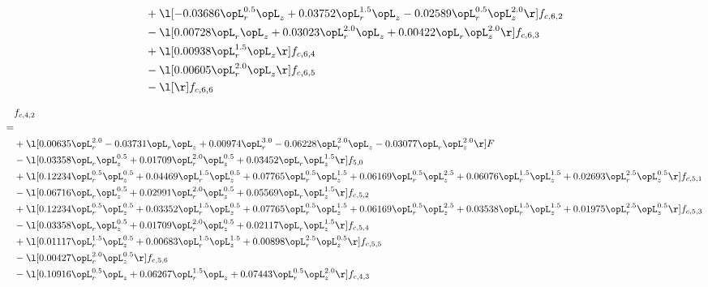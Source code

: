 \begin{alignat}{2}
& + \l[  -0.03686 \opL_r^{0.5} \opL_z +  0.03752 \opL_r^{1.5} \opL_z   -0.02589 \opL_r^{0.5} \opL_z^{2.0}  \r] f_{c,6,2} \nonumber \\ 
& - \l[  0.00728 \opL_r \opL_z +  0.03023 \opL_r^{2.0} \opL_z +  0.00422 \opL_r \opL_z^{2.0}  \r] f_{c,6,3} \nonumber \\ 
& + \l[  0.00938 \opL_r^{1.5} \opL_z  \r] f_{c,6,4} \nonumber \\ 
& - \l[  0.00605 \opL_r^{2.0} \opL_z  \r] f_{c,6,5} \nonumber \\ 
& - \l[  \r] f_{c,6,6} \nonumber \\ 
\end{alignat} 


\begin{alignat}{2} 
\label{eq:f_42_2} 
& f_{c,4,2} \nonumber \\ 
 = \\ 
& + \l[  0.00635 \opL_r^{2.0}   -0.03731 \opL_r \opL_z +  0.00974 \opL_r^{3.0}   -0.06228 \opL_r^{2.0} \opL_z   -0.03077 \opL_r \opL_z^{2.0}  \r] F \nonumber \\ 
& - \l[  0.03358 \opL_r \opL_z^{0.5} +  0.01709 \opL_r^{2.0} \opL_z^{0.5} +  0.03452 \opL_r \opL_z^{1.5}  \r] f_{5,0} \nonumber \\ 
& + \l[  0.12234 \opL_r^{0.5} \opL_z^{0.5} +  0.04469 \opL_r^{1.5} \opL_z^{0.5} +  0.07765 \opL_r^{0.5} \opL_z^{1.5} +  0.06169 \opL_r^{0.5} \opL_z^{2.5} +  0.06076 \opL_r^{1.5} \opL_z^{1.5} +  0.02693 \opL_r^{2.5} \opL_z^{0.5}  \r] f_{c,5,1} \nonumber \\ 
& - \l[  0.06716 \opL_r \opL_z^{0.5} +  0.02991 \opL_r^{2.0} \opL_z^{0.5} +  0.05569 \opL_r \opL_z^{1.5}  \r] f_{c,5,2} \nonumber \\ 
& + \l[  0.12234 \opL_r^{0.5} \opL_z^{0.5} +  0.03352 \opL_r^{1.5} \opL_z^{0.5} +  0.07765 \opL_r^{0.5} \opL_z^{1.5} +  0.06169 \opL_r^{0.5} \opL_z^{2.5} +  0.03538 \opL_r^{1.5} \opL_z^{1.5} +  0.01975 \opL_r^{2.5} \opL_z^{0.5}  \r] f_{c,5,3} \nonumber \\ 
& - \l[  0.03358 \opL_r \opL_z^{0.5} +  0.01709 \opL_r^{2.0} \opL_z^{0.5} +  0.02117 \opL_r \opL_z^{1.5}  \r] f_{c,5,4} \nonumber \\ 
& + \l[  0.01117 \opL_r^{1.5} \opL_z^{0.5} +  0.00683 \opL_r^{1.5} \opL_z^{1.5} +  0.00898 \opL_r^{2.5} \opL_z^{0.5}  \r] f_{c,5,5} \nonumber \\ 
& - \l[  0.00427 \opL_r^{2.0} \opL_z^{0.5}  \r] f_{c,5,6} \nonumber \\ 
& - \l[  0.10916 \opL_r^{0.5} \opL_z +  0.06267 \opL_r^{1.5} \opL_z +  0.07443 \opL_r^{0.5} \opL_z^{2.0}  \r] f_{c,4,3} \nonumber \\ 

\end{alignat}
